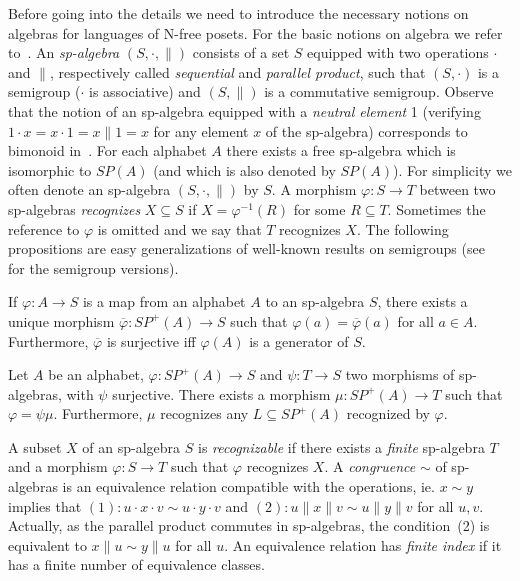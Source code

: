 \documentclass{CSML}
\begin{document}
Before going into the details we need to introduce the necessary notions on algebras for languages of N-free posets.
For the basic notions on algebra we refer to~\cite{Alm94}.
An \emph{sp-algebra} $(S,\cdot,\parallel)$ consists of a set $S$ equipped with two operations $\cdot$ and $\parallel$, respectively called \emph{sequential} and \emph{parallel product}, such that $(S,\cdot)$ is a semigroup ($\cdot$ is associative) and $(S,\parallel)$ is a commutative semigroup. Observe that the notion of an sp-algebra equipped with a \emph{neutral element} 1 (verifying $1\cdot x=x\cdot 1=x\parallel 1=x$ for any element $x$ of the sp-algebra) corresponds to bimonoid in~\cite{Bloom199655}. For each alphabet $A$ there exists a free sp-algebra which is isomorphic to $SP(A)$ (and which is also denoted by $SP(A)$). 
For simplicity we often denote an sp-algebra $(S,\cdot,\parallel)$ by $S$.
A morphism $\varphi:S\to T$ between two sp-algebras \emph{recognizes} $X\subseteq S$ if $X=\varphi^{-1}(R)$ for some $R\subseteq T$. Sometimes the reference to $\varphi$ is omitted and we say that $T$ recognizes $X$.
The following propositions are easy generalizations of well-known results on semigroups (see~\cite[Prop.~1.8 and 1.9]{Pin84} for the semigroup versions).
\begin{prop}
  If $\varphi: A\to S$ is a map from an alphabet $A$ to an sp-algebra $S$, there exists a unique morphism $\overline{\varphi}:SP^+(A) \to S$ such that $\varphi(a)=\overline{\varphi}(a)$ for all $a\in A$. Furthermore, $\overline{\varphi}$ is surjective iff $\varphi(A)$ is a generator of $S$.
\end{prop}
\begin{prop}
  Let $A$ be an alphabet, $\varphi:SP^+(A)\to S$ and $\psi:T\to S$ two morphisms of sp-algebras, with $\psi$ surjective. There exists a morphism $\mu:SP^+(A)\to T$ such that $\varphi=\psi\mu$. Furthermore, $\mu$ recognizes any $L\subseteq SP^+(A)$ recognized by $\varphi$.
\end{prop}
A subset $X$ of an sp-algebra $S$ is \emph{recognizable} if there exists a \emph{finite} sp-algebra $T$ and a morphism $\varphi:S\to T$ such that $\varphi$ recognizes $X$. A \emph{congruence} $\sim$ of sp-algebras is an equivalence relation compatible with the operations, ie. $x\sim y$ implies that $(1): u\cdot x\cdot v\sim u\cdot y\cdot v$ and $(2): u\parallel x\parallel v\sim u\parallel y\parallel v$ for all $u,v$. Actually, as the parallel product commutes in sp-algebras, the condition~(2) is equivalent to $x\parallel u\sim y\parallel u$ for all $u$. An equivalence relation has \emph{finite index} if it has a finite number of equivalence classes.
\end{document}

